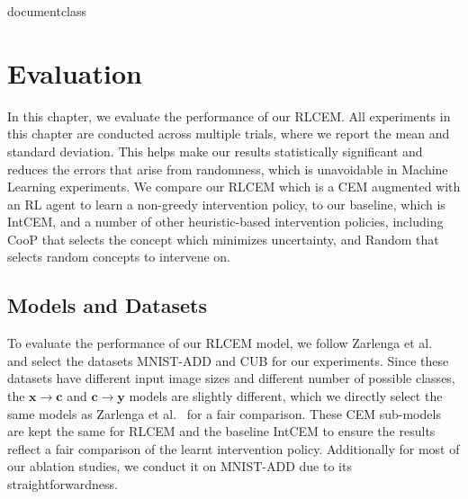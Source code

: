 \csname documentclass

\chapter{Evaluation}

In this chapter, we evaluate the performance of our RLCEM. All experiments in this chapter
are conducted across multiple trials, where we report the mean
and standard deviation. This helps make our results statistically significant and reduces the errors
that arise from randomness, which is unavoidable in Machine
Learning experiments.
We compare our RLCEM which is a CEM augmented with an RL agent to learn 
a non-greedy intervention policy, to our baseline, which is IntCEM, and a number of other
heuristic-based intervention policies, 
including CooP that selects the 
concept which minimizes uncertainty, and Random that selects
random concepts to intervene on.

\section{Models and Datasets}\label{method:datasets}
To evaluate the performance of our RLCEM model,
we follow Zarlenga et al.~\cite{intcem} and select the datasets MNIST-ADD and CUB for 
our experiments. Since these datasets have different input image sizes
and different number of possible classes,
the $\mathbf{x} \to \mathbf{c}$ and $\mathbf{c} \to \mathbf{y}$ models 
are slightly different, which we directly select the same 
models as Zarlenga et al.~\cite{intcem}
for a fair comparison. These CEM sub-models are kept the same
for RLCEM and the baseline IntCEM to ensure the results reflect a fair comparison 
of the learnt intervention policy.
Additionally for most of our ablation studies,
we conduct it on MNIST-ADD due to its straightforwardness.

